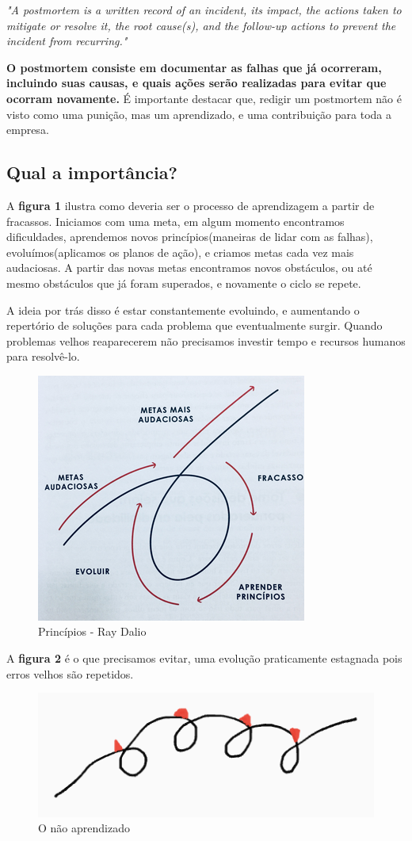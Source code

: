 \documentclass[a4paper, 12pt]{article}
\begin{document}
	\begin{flushright}
		\textit{"A postmortem is a written record of an incident, its impact, the actions taken to mitigate or resolve it, the root cause(s), and the follow-up actions to prevent the incident from recurring."
	}
	\end{flushright}

	\textbf{O postmortem consiste em documentar as falhas que já ocorreram, incluindo suas causas, e quais ações serão realizadas para evitar que ocorram novamente.} É importante destacar que, redigir um postmortem não é visto como uma punição, mas um aprendizado, e uma contribuição para toda a empresa. 
	
	\subsection{Qual a importância?}
	A \textbf{figura 1} ilustra como deveria ser o processo de aprendizagem a partir de fracassos. Iniciamos com uma meta, em algum momento encontramos dificuldades, aprendemos novos princípios(maneiras de lidar com as falhas), evoluímos(aplicamos os planos de ação), e criamos metas cada vez mais audaciosas. A partir das novas metas encontramos novos obstáculos, ou até mesmo obstáculos que já foram superados, e novamente o ciclo se repete.
	
	A ideia por trás disso é estar constantemente evoluindo, e aumentando o repertório de soluções para cada problema que eventualmente surgir. Quando problemas velhos reaparecerem não precisamos investir tempo e recursos humanos para resolvê-lo.
	\begin{figure}[h]
		\centering
		\includegraphics[width=0.3\linewidth]{imagens/princi}
		\caption{Princípios - Ray Dalio}
		\label{fig:princi}
	\end{figure}
	
	A \textbf{figura 2} é o que precisamos evitar, uma evolução praticamente estagnada pois erros velhos são repetidos.
	\begin{figure}[h]
		\centering
		\includegraphics[width=0.5\linewidth]{imagens/princi1}
		\caption{O não aprendizado}
		\label{fig:princi1}
	\end{figure}
	
\end{document}
